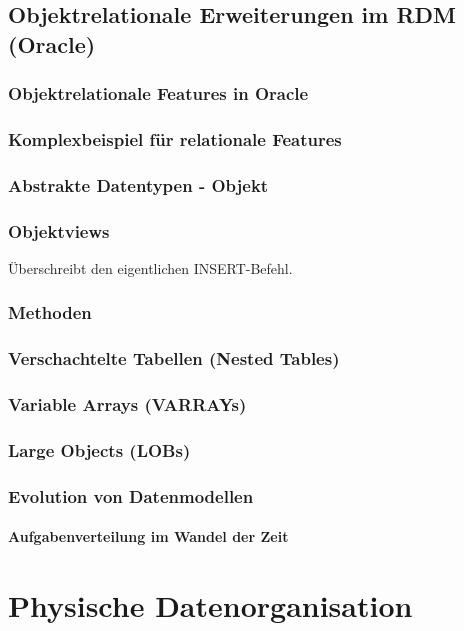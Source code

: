 \section{Objektrelationale Erweiterungen im RDM (Oracle)}
\subsection{Objektrelationale Features in Oracle}
\subsection{Komplexbeispiel für relationale Features}
\subsection{Abstrakte Datentypen - Objekt}
\subsection{Objektviews}
Überschreibt den eigentlichen INSERT-Befehl.
\subsection{Methoden}
\subsection{Verschachtelte Tabellen (Nested Tables)}
\subsection{Variable Arrays (VARRAYs)}
\subsection{Large Objects (LOBs)}
\subsection{Evolution von Datenmodellen}
\subsubsection{Aufgabenverteilung im Wandel der Zeit}

\chapter{Physische Datenorganisation}
